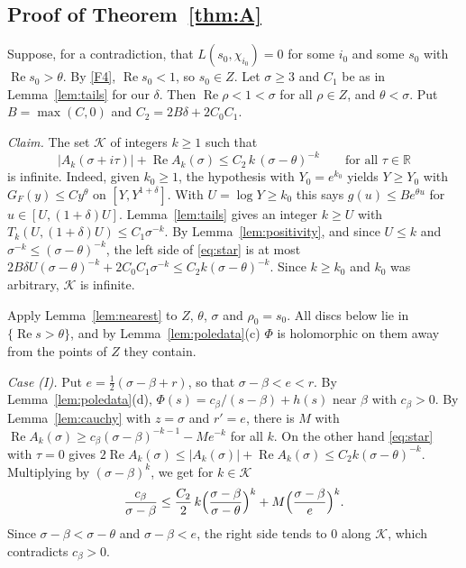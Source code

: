 \documentclass[11pt]{amsart}
\newcommand{\R}{\mathbb{R}}
\newcommand{\re}{\operatorname{Re}}
\theoremstyle{plain}
\theoremstyle{definition}
\numberwithin{equation}{section}
\begin{document}
\subsection{Proof of Theorem~\ref{thm:A}}

Suppose, for a contradiction, that $L(s_0,\chi_{i_0})=0$ for some $i_0$ and some $s_0$ with
$\re s_0>\theta$. By \ref{F4}, $\re s_0<1$, so $s_0\in Z$. Let $\sigma\ge3$ and $C_1$ be as in
Lemma~\ref{lem:tails} for our $\delta$. Then $\re\rho<1<\sigma$ for all $\rho\in Z$, and
$\theta<\sigma$. Put $B=\max(C,0)$ and $C_2=2B\delta+2C_0C_1$.

\emph{Claim.} The set $\mathcal K$ of integers $k\ge1$ such that
\begin{equation}\label{eq:star}
|A_k(\sigma+i\tau)|+\re A_k(\sigma)\le C_2\,k\,(\sigma-\theta)^{-k}\qquad\text{for all }\tau\in\R
\end{equation}
is infinite. Indeed, given $k_0\ge1$, the hypothesis with $Y_0=e^{k_0}$ yields $Y\ge Y_0$ with
$G_F(y)\le Cy^\theta$ on $[Y,Y^{1+\delta}]$. With $U=\log Y\ge k_0$ this says
$g(u)\le Be^{\theta u}$ for $u\in[U,(1+\delta)U]$. Lemma~\ref{lem:tails} gives an integer $k\ge U$
with $T_k(U,(1+\delta)U)\le C_1\sigma^{-k}$. By Lemma~\ref{lem:positivity}, and since $U\le k$
and $\sigma^{-k}\le(\sigma-\theta)^{-k}$, the left side of \eqref{eq:star} is at most
$2B\delta U(\sigma-\theta)^{-k}+2C_0C_1\sigma^{-k}\le C_2k(\sigma-\theta)^{-k}$. Since $k\ge k_0$
and $k_0$ was arbitrary, $\mathcal K$ is infinite.

Apply Lemma~\ref{lem:nearest} to $Z$, $\theta$, $\sigma$ and $\rho_0=s_0$. All discs below lie in
$\{\re s>\theta\}$, and by Lemma~\ref{lem:poledata}(c) $\Phi$ is holomorphic on them away from the
points of $Z$ they contain.

\emph{Case (I).} Put $e=\frac12(\sigma-\beta+r)$, so that $\sigma-\beta<e<r$. By
Lemma~\ref{lem:poledata}(d), $\Phi(s)=c_\beta/(s-\beta)+h(s)$ near $\beta$ with $c_\beta>0$. By
Lemma~\ref{lem:cauchy} with $z=\sigma$ and $r'=e$, there is $M$ with
$\re A_k(\sigma)\ge c_\beta(\sigma-\beta)^{-k-1}-Me^{-k}$ for all $k$. On the other hand
\eqref{eq:star} with $\tau=0$ gives
$2\re A_k(\sigma)\le|A_k(\sigma)|+\re A_k(\sigma)\le C_2k(\sigma-\theta)^{-k}$. Multiplying by
$(\sigma-\beta)^k$, we get for $k\in\mathcal K$
\[
\frac{c_\beta}{\sigma-\beta}\le\frac{C_2}{2}\,k\Bigl(\frac{\sigma-\beta}{\sigma-\theta}\Bigr)^{k}+M\Bigl(\frac{\sigma-\beta}{e}\Bigr)^{k}.
\]
Since $\sigma-\beta<\sigma-\theta$ and $\sigma-\beta<e$, the right side tends to $0$ along
$\mathcal K$, which contradicts $c_\beta>0$.
\end{document}
